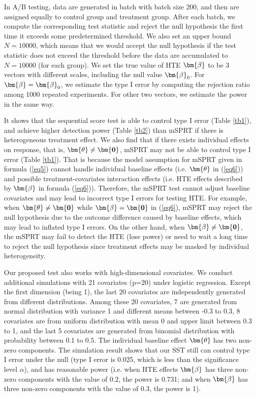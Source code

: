\documentclass[letterpaper]{article} %
\newcommand{\V}[1]{{\bm{\mathbf{\MakeLowercase{#1}}}}} %
\begin{document}
In A/B testing, data are generated in batch with batch size 200, and then are assigned equally to control group and treatment group. After each batch, we compute the corresponding test statistic and reject the null hypothesis the first time it exceeds some predetermined threshold. We also set an upper bound $N=10000$, which means that we would accept the null hypothesis if the test statistic does not exceed the threshold before the data are accumulated to $N=10000$ (for each group). We set the true value of HTE $\V{\beta}$ to be 3 vectors with different scales, including the null value $\V{\beta}_0$. For $\V{\beta}=\V{\beta}_0$, we estimate the type I error by computing the rejection ratio among 1000 repeated experiments. For other two vectors, we estimate the power in the same way.

It shows that the sequential score test is able to control type I error (Table \ref{tb1}), and achieve higher detection power (Table \ref{tb2}) than mSPRT if there is heterogeneous treatment effect. We also find that if there exists individual effects on response, that is, $\V{\theta}\neq \V{0}$, mSPRT may not be able to control type I error (Table \ref{tb1}). That is because the model assumption for mSPRT given in formula (\ref{eq5}) cannot handle individual baseline effects (i.e. $\V{\theta}$ in (\ref{eq6})) and possible treatment-covariates interaction effects (i.e. HTE effects described by $\V{\beta}$ in formula (\ref{eq6})). Therefore, the mSPRT test cannot adjust baseline covariates and may lead to incorrect type I errors for testing HTE. For example, when $\V{\theta} \neq \V{0}$ while $\V{\beta} = \V{0}$ in (\ref{eq6}), mSPRT may reject the null hypothesis due to the outcome difference caused by baseline effects, which may lead to inflated type I errors. On the other hand, when $\V{\beta} \neq \V{0}$, the mSPRT may fail to detect the HTE (lose power) or need to wait a long time to reject the null hypothesis since treatment effects may be masked by individual heterogeneity.

Our proposed test also works with high-dimensional covariates. We conduct additional simulations with 21 covariates (p=20) under logistic regression. Except the first dimension (being 1), the last 20 covariates are independently generated from different distributions. Among these 20 covariates, 7 are generated from normal distribution with variance 1 and different means between -0.3 to 0.3, 8 covariates are from uniform distribution with mean 0 and upper limit between 0.3 to 1, and the last 5 covariates are generated from binomial distribution with probability between 0.1 to 0.5. The individual baseline effect $\V{\theta}$ has two non-zero components. The simulation result shows that our SST still can control type I error under the null (type I error is 0.025, which is less than the significance level $\alpha$), and has reasonable power (i.e. when HTE effects $\V{\beta}$ has three non-zero components with the value of 0.2, the power is 0.731; and when $\V{\beta}$ has three non-zero components with the value of 0.3, the power is 1).
\end{document}
